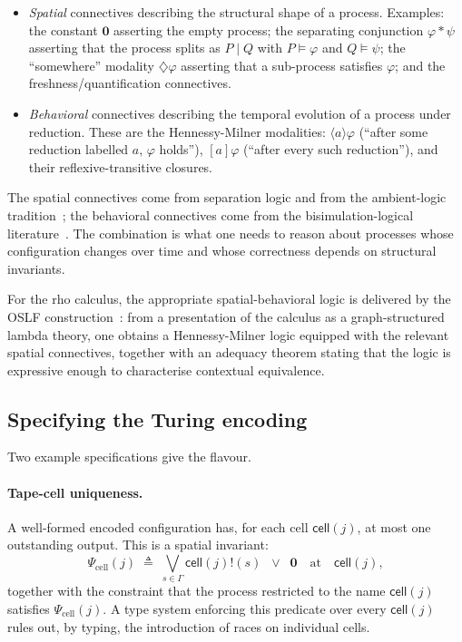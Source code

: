 \documentclass[11pt]{article}
\theoremstyle{plain}
\theoremstyle{definition}
\theoremstyle{remark}
\newcommand{\nil}{\mathbf{0}}
\newcommand{\snd}[2]{#1!(#2)}
\newcommand{\sn}{\mathbin{\mid}}    %
\newcommand{\Cell}{\mathsf{cell}}
\newcommand{\Tap}{\Gamma}
\begin{document}
\begin{itemize}
\item \emph{Spatial} connectives describing the structural shape of a
process. Examples: the constant $\nil$ asserting the empty process; the
separating conjunction $\varphi * \psi$ asserting that the process
splits as $P \sn Q$ with $P \models \varphi$ and $Q \models \psi$; the
``somewhere'' modality $\diamondsuit\varphi$ asserting that a sub-process
satisfies $\varphi$; and the freshness/quantification connectives.
\item \emph{Behavioral} connectives describing the temporal evolution of
a process under reduction. These are the Hennessy-Milner modalities:
$\langle a \rangle \varphi$ (``after some reduction labelled $a$,
$\varphi$ holds''), $[a]\varphi$ (``after every such reduction''), and
their reflexive-transitive closures.
\end{itemize}

The spatial connectives come from separation logic and from the
ambient-logic tradition~\cite{CairesCardelli03}; the behavioral
connectives come from the bisimulation-logical
literature~\cite{HennessyMilner85}. The combination is what one needs to
reason about processes whose configuration changes over time and whose
correctness depends on structural invariants.

For the rho calculus, the appropriate spatial-behavioral logic is
delivered by the OSLF construction~\cite{OSLF}: from a presentation of
the calculus as a graph-structured lambda theory, one obtains a
Hennessy-Milner logic equipped with the relevant spatial connectives,
together with an adequacy theorem stating that the logic is
expressive enough to characterise contextual equivalence.

\subsection{Specifying the Turing encoding}

Two example specifications give the flavour.

\paragraph{Tape-cell uniqueness.}
A well-formed encoded configuration has, for each cell $\Cell(j)$, at
most one outstanding output. This is a spatial invariant:
$$
\Psi_{\text{cell}}(j)
\;\triangleq\;
\bigvee_{s \in \Tap} \snd{\Cell(j)}{s} \;\;\lor\;\; \nil
\quad\text{at}\quad \Cell(j),
$$
together with the constraint that the process restricted to the name
$\Cell(j)$ satisfies $\Psi_{\text{cell}}(j)$. A type system enforcing this
predicate over every $\Cell(j)$ rules out, by typing, the introduction of
races on individual cells.
\end{document}

